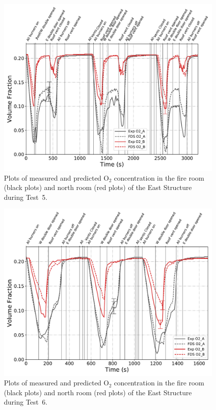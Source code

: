 \begin{figure}[!h]
	\centering
	\includegraphics[width=\columnwidth]{Figures/Plots/Validation/Gas_Concentration/Test_5_O2}
	\caption[Plots of measured and predicted O$_2$ concentration during Test~5.]{Plots of measured and predicted O$_2$ concentration in the fire room (black plots) and north room (red plots) of the East Structure during Test~5.}
	\label{fig:Test5_O2}
\end{figure}

\begin{figure}[!h]
	\centering
	\includegraphics[width=\columnwidth]{Figures/Plots/Validation/Gas_Concentration/Test_6_O2}
	\caption[Plots of measured and predicted O$_2$ concentration during Test~6.]{Plots of measured and predicted O$_2$ concentration in the fire room (black plots) and north room (red plots) of the East Structure during Test~6.}
	\label{fig:Test6_O2}
\end{figure}

